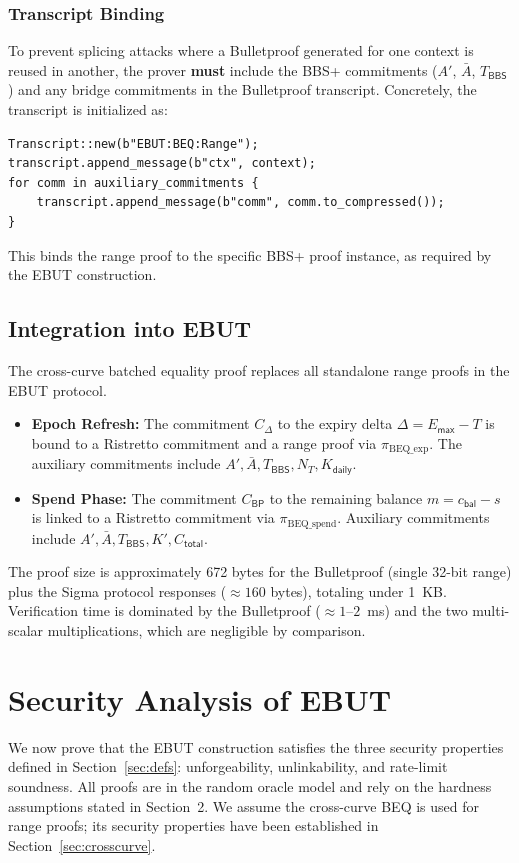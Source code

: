 \documentclass[11pt]{article}
\theoremstyle{definitionstyle}
\theoremstyle{plain}
\begin{document}
\subsubsection{Transcript Binding}
To prevent splicing attacks where a Bulletproof generated for one context is reused in another, the prover \textbf{must} include the BBS+ commitments ($A'$, $\bar{A}$, $T_{\mathsf{BBS}}$) and any bridge commitments in the Bulletproof transcript. Concretely, the transcript is initialized as:
\begin{verbatim}
Transcript::new(b"EBUT:BEQ:Range");
transcript.append_message(b"ctx", context);
for comm in auxiliary_commitments {
    transcript.append_message(b"comm", comm.to_compressed());
}
\end{verbatim}
This binds the range proof to the specific BBS+ proof instance, as required by the EBUT construction.

\subsection{Integration into EBUT}
The cross-curve batched equality proof replaces all standalone range proofs in the EBUT protocol.
\begin{itemize}
\item \textbf{Epoch Refresh:} The commitment $C_{\Delta}$ to the expiry delta $\Delta = E_{\mathsf{max}} - T$ is bound to a Ristretto commitment and a range proof via $\pi_{\text{BEQ\_exp}}$. The auxiliary commitments include $A', \bar{A}, T_{\mathsf{BBS}}, N_T, K_{\mathsf{daily}}$.
\item \textbf{Spend Phase:} The commitment $C_{\mathsf{BP}}$ to the remaining balance $m = c_{\mathsf{bal}} - s$ is linked to a Ristretto commitment via $\pi_{\text{BEQ\_spend}}$. Auxiliary commitments include $A', \bar{A}, T_{\mathsf{BBS}}, K', C_{\mathsf{total}}$.
\end{itemize}
The proof size is approximately 672 bytes for the Bulletproof (single 32-bit range) plus the Sigma protocol responses ($\approx 160$ bytes), totaling under 1~KB. Verification time is dominated by the Bulletproof ($\approx 1$--$2$~ms) and the two multi-scalar multiplications, which are negligible by comparison.

\section{Security Analysis of EBUT}
\label{sec:security-ebut}

We now prove that the EBUT construction satisfies the three security properties defined in Section~\ref{sec:defs}: unforgeability, unlinkability, and rate-limit soundness. All proofs are in the random oracle model and rely on the hardness assumptions stated in Section~2. We assume the cross-curve BEQ is used for range proofs; its security properties have been established in Section~\ref{sec:crosscurve}.
\end{document}
